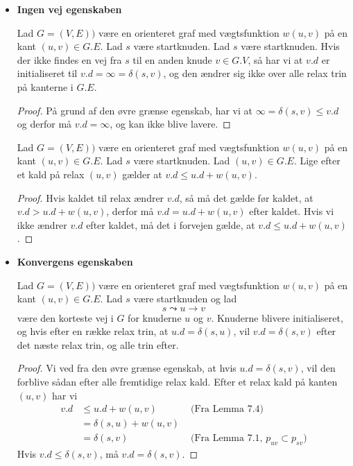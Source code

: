 \begin{itemize}
\item \textbf{Ingen vej egenskaben}
  \begin{corollary}
    Lad $G = (V,E))$ være en orienteret graf med vægtsfunktion $w(u,v)$ på en kant $(u,v) \in G.E$. Lad $s$ være startknuden. Lad $s$ være startknuden. Hvis der ikke findes en vej fra $s$ til en anden knude $v \in G.V$, så har vi at $v.d$ er initialiseret til $v.d = \infty = \delta(s,v)$, og den ændrer sig ikke over alle relax trin på kanterne i $G.E$.
  \end{corollary}

  \begin{proof}
    På grund af den øvre grænse egenskab, har vi at $\infty = \delta(s,v) \leq v.d$ og derfor må $v.d = \infty$, og kan ikke blive lavere.
  \end{proof}

  \begin{lemma}
    Lad $G = (V,E))$ være en orienteret graf med vægtsfunktion $w(u,v)$ på en kant $(u,v) \in G.E$. Lad $s$ være startknuden. Lad $(u,v) \in G.E$. Lige efter et kald på relax $(u,v)$ gælder at $v.d \leq u.d + w(u,v)$.
  \end{lemma}

  \begin{proof}
    Hvis kaldet til relax ændrer $v.d$, så må det gælde før kaldet, at $v.d > u.d + w(u,v)$, derfor må $v.d = u.d + w(u,v)$ efter kaldet. Hvis vi ikke ændrer $v.d$ efter kaldet, må det i forvejen gælde, at
    $v.d \leq u.d + w(u,v)$.
  \end{proof}

\item \textbf{Konvergens egenskaben}
  \begin{lemma}
    Lad $G = (V,E))$ være en orienteret graf med vægtsfunktion $w(u,v)$ på en kant $(u,v) \in G.E$. Lad $s$ være startknuden og lad
    $$s \leadsto u \rightarrow v$$
    være den korteste vej i $G$ for knuderne $u$ og $v$. Knuderne blivere initialiseret, og hvis efter en række relax trin, at $u.d = \delta(s,u)$, vil $v.d = \delta(s,v)$ efter det næste relax trin, og alle trin efter.
  \end{lemma}

  \begin{proof}
    Vi ved fra den øvre grænse egenskab, at hvis $u.d = \delta(s,v)$, vil den forblive sådan efter alle fremtidige relax kald. Efter et relax kald på kanten $(u,v)$ har vi
    \begin{align*}
      v.d &\leq u.d + w(u,v) &\text{ (Fra Lemma 7.4)}\\
          &= \delta(s,u) + w(u,v)&\\
          &= \delta(s,v)     &\text{ (Fra Lemma 7.1, } p_{uv} \subset p_{sv})
    \end{align*}
    Hvis $v.d \leq \delta(s,v)$, må $v.d=\delta(s,v)$.
  \end{proof}



\end{itemize}
